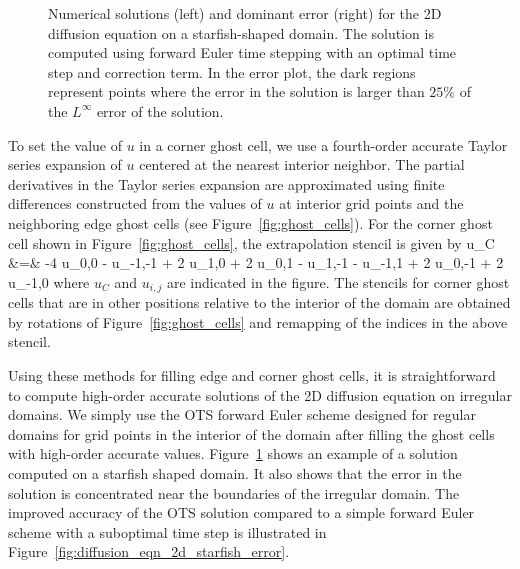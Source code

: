 \documentclass[fleqn,12pt,twoside]{article}
\begin{document}
\begin{figure}[tb]
\begin{center}
\caption{Numerical solutions (left) and dominant error (right) for the 2D 
diffusion equation on a starfish-shaped domain.  The solution is computed 
using forward Euler time stepping with an optimal time step and correction 
term.  In the error plot, the dark regions represent points 
where the error in the solution is larger than $25$\% of the $L^\infty$ error 
of the solution.  
}
\label{fig:diffusion_eqn_2d_starfish_domain}
\end{center}
\end{figure}

To set the value of $u$ in a corner ghost cell, we use a fourth-order accurate
Taylor series expansion of $u$ centered at the nearest interior 
neighbor.  The partial derivatives in the Taylor series expansion are 
approximated using finite differences constructed from the values of $u$ 
at interior grid points and the neighboring edge ghost cells (see 
Figure~\ref{fig:ghost_cells}).  For the corner ghost cell shown 
in Figure~\ref{fig:ghost_cells}, the extrapolation stencil is given by
\bea
  u_C &=&  -4 u_{0,0} - u_{-1,-1} + 2 u_{1,0} + 2 u_{0,1}
      - u_{1,-1} - u_{-1,1} + 2 u_{0,-1} + 2 u_{-1,0}
\eea
where $u_C$ and $u_{i,j}$ are indicated in the figure.  The stencils for
corner ghost cells that are in other positions relative to the interior of 
the domain are obtained by rotations of Figure~\ref{fig:ghost_cells} and 
remapping of the indices in the above stencil.

Using these methods for filling edge and corner ghost cells, it is 
straightforward to compute high-order accurate solutions of the 2D diffusion 
equation on irregular domains.  We simply use the OTS forward Euler scheme 
designed for regular domains for grid points in the interior of the domain
after filling the ghost cells with high-order accurate values.  
Figure~\ref{fig:diffusion_eqn_2d_starfish_domain} shows an example of 
a solution computed on a starfish shaped domain.  It also shows that the 
error in the solution is concentrated near the boundaries of the irregular
domain.  The improved accuracy of the OTS solution compared to a simple 
forward Euler scheme with a suboptimal time step is illustrated in 
Figure~\ref{fig:diffusion_eqn_2d_starfish_error}. 
\end{document}
